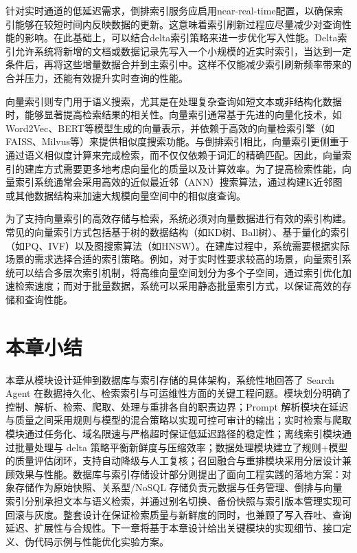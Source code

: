 针对实时通道的低延迟需求，倒排索引服务应启用near-real-time配置，以确保索引能够在较短时间内反映数据的更新。这意味着索引刷新过程应尽量减少对查询性能的影响。在此基础上，可以结合delta索引策略来进一步优化写入性能。Delta索引允许系统将新增的文档或数据记录先写入一个小规模的近实时索引，当达到一定条件后，再将这些增量数据合并到主索引中。这样不仅能减少索引刷新频率带来的合并压力，还能有效提升实时查询的性能。

向量索引则专门用于语义搜索，尤其是在处理复杂查询如短文本或非结构化数据时，能够显著提高检索结果的相关性。向量索引通常基于先进的向量化技术，如Word2Vec、BERT等模型生成的向量表示，并依赖于高效的向量检索引擎（如FAISS、Milvus等）来提供相似度搜索功能。与倒排索引相比，向量索引更侧重于通过语义相似度计算来完成检索，而不仅仅依赖于词汇的精确匹配。因此，向量索引的建库方式需要更多地考虑向量化的质量以及计算效率。为了提高检索性能，向量索引系统通常会采用高效的近似最近邻（ANN）搜索算法，通过构建K近邻图或其他数据结构来加速大规模向量空间中的相似度查询。

为了支持向量索引的高效存储与检索，系统必须对向量数据进行有效的索引构建。常见的向量索引方式包括基于树的数据结构（如KD树、Ball树）、基于量化的索引（如PQ、IVF）以及图搜索算法（如HNSW）。在建库过程中，系统需要根据实际场景的需求选择合适的索引策略。例如，对于实时性要求较高的场景，向量索引系统可以结合多层次索引机制，将高维向量空间划分为多个子空间，通过索引优化加速检索速度；而对于批量数据，系统可以采用静态批量索引方式，以保证高效的存储和查询性能。
\section{本章小结}
本章从模块设计延伸到数据库与索引存储的具体架构，系统性地回答了 Search Agent 在数据持久化、检索索引与可运维性方面的关键工程问题。模块划分明确了控制、解析、检索、爬取、处理与重排各自的职责边界；Prompt 解析模块在延迟与质量之间采用规则与模型的混合策略以实现可控可审计的输出；实时检索与爬取模块通过任务化、域名限速与严格超时保证低延迟路径的稳定性；离线索引模块通过批量处理与 delta 策略平衡新鲜度与压缩效率；数据处理模块建立了规则+模型的质量评估闭环，支持自动降级与人工复核；召回融合与重排模块采用分层设计兼顾效果与性能。数据库与索引存储设计部分则提出了面向工程实践的落地方案：对象存储作为原始快照、关系型/NoSQL 存储负责元数据与任务管理、倒排与向量索引分别承担文本与语义检索，并通过别名切换、备份快照与索引版本管理实现可回滚与灰度。整套设计在保证检索质量与新鲜度的同时，也兼顾了写入吞吐、查询延迟、扩展性与合规性。下一章将基于本章设计给出关键模块的实现细节、接口定义、伪代码示例与性能优化实验方案。